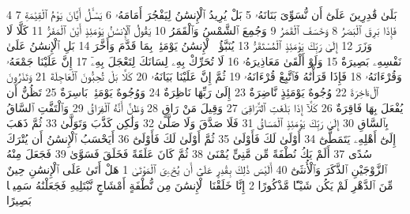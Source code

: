 {\tiny\colorbox{cl_aya}{4}} بَلَىٰ قَٰدِرِينَ عَلَىٰٓ أَن نُّسَوِّىَ بَنَانَهُۥ
{\tiny\colorbox{cl_aya}{5}} بَلْ يُرِيدُ ٱلْإِنسَٰنُ لِيَفْجُرَ أَمَامَهُۥ
{\tiny\colorbox{cl_aya}{6}} يَسْـَٔلُ أَيَّانَ يَوْمُ ٱلْقِيَٰمَةِ
{\tiny\colorbox{cl_aya}{7}} فَإِذَا بَرِقَ ٱلْبَصَرُ
{\tiny\colorbox{cl_aya}{8}} وَخَسَفَ ٱلْقَمَرُ
{\tiny\colorbox{cl_aya}{9}} وَجُمِعَ ٱلشَّمْسُ وَٱلْقَمَرُ
{\tiny\colorbox{cl_aya}{10}} يَقُولُ ٱلْإِنسَٰنُ يَوْمَئِذٍ أَيْنَ ٱلْمَفَرُّ
{\tiny\colorbox{cl_aya}{11}} كَلَّا لَا وَزَرَ
{\tiny\colorbox{cl_aya}{12}} إِلَىٰ رَبِّكَ يَوْمَئِذٍ ٱلْمُسْتَقَرُّ
{\tiny\colorbox{cl_aya}{13}} يُنَبَّؤُا۟ ٱلْإِنسَٰنُ يَوْمَئِذٍۭ بِمَا قَدَّمَ وَأَخَّرَ
{\tiny\colorbox{cl_aya}{14}} بَلِ ٱلْإِنسَٰنُ عَلَىٰ نَفْسِهِۦ بَصِيرَةٌ
{\tiny\colorbox{cl_aya}{15}} وَلَوْ أَلْقَىٰ مَعَاذِيرَهُۥ
{\tiny\colorbox{cl_aya}{16}} لَا تُحَرِّكْ بِهِۦ لِسَانَكَ لِتَعْجَلَ بِهِۦٓ
{\tiny\colorbox{cl_aya}{17}} إِنَّ عَلَيْنَا جَمْعَهُۥ وَقُرْءَانَهُۥ
{\tiny\colorbox{cl_aya}{18}} فَإِذَا قَرَأْنَٰهُ فَٱتَّبِعْ قُرْءَانَهُۥ
{\tiny\colorbox{cl_aya}{19}} ثُمَّ إِنَّ عَلَيْنَا بَيَانَهُۥ
{\tiny\colorbox{cl_aya}{20}} كَلَّا بَلْ تُحِبُّونَ ٱلْعَاجِلَةَ
{\tiny\colorbox{cl_aya}{21}} وَتَذَرُونَ ٱلْءَاخِرَةَ
{\tiny\colorbox{cl_aya}{22}} وُجُوهٌ يَوْمَئِذٍ نَّاضِرَةٌ
{\tiny\colorbox{cl_aya}{23}} إِلَىٰ رَبِّهَا نَاظِرَةٌ
{\tiny\colorbox{cl_aya}{24}} وَوُجُوهٌ يَوْمَئِذٍۭ بَاسِرَةٌ
{\tiny\colorbox{cl_aya}{25}} تَظُنُّ أَن يُفْعَلَ بِهَا فَاقِرَةٌ
{\tiny\colorbox{cl_aya}{26}} كَلَّآ إِذَا بَلَغَتِ ٱلتَّرَاقِىَ
{\tiny\colorbox{cl_aya}{27}} وَقِيلَ مَنْ رَاقٍ
{\tiny\colorbox{cl_aya}{28}} وَظَنَّ أَنَّهُ ٱلْفِرَاقُ
{\tiny\colorbox{cl_aya}{29}} وَٱلْتَفَّتِ ٱلسَّاقُ بِٱلسَّاقِ
{\tiny\colorbox{cl_aya}{30}} إِلَىٰ رَبِّكَ يَوْمَئِذٍ ٱلْمَسَاقُ
{\tiny\colorbox{cl_aya}{31}} فَلَا صَدَّقَ وَلَا صَلَّىٰ
{\tiny\colorbox{cl_aya}{32}} وَلَٰكِن كَذَّبَ وَتَوَلَّىٰ
{\tiny\colorbox{cl_aya}{33}} ثُمَّ ذَهَبَ إِلَىٰٓ أَهْلِهِۦ يَتَمَطَّىٰٓ
{\tiny\colorbox{cl_aya}{34}} أَوْلَىٰ لَكَ فَأَوْلَىٰ
{\tiny\colorbox{cl_aya}{35}} ثُمَّ أَوْلَىٰ لَكَ فَأَوْلَىٰٓ
{\tiny\colorbox{cl_aya}{36}} أَيَحْسَبُ ٱلْإِنسَٰنُ أَن يُتْرَكَ سُدًى
{\tiny\colorbox{cl_aya}{37}} أَلَمْ يَكُ نُطْفَةً مِّن مَّنِىٍّ يُمْنَىٰ
{\tiny\colorbox{cl_aya}{38}} ثُمَّ كَانَ عَلَقَةً فَخَلَقَ فَسَوَّىٰ
{\tiny\colorbox{cl_aya}{39}} فَجَعَلَ مِنْهُ ٱلزَّوْجَيْنِ ٱلذَّكَرَ وَٱلْأُنثَىٰٓ
{\tiny\colorbox{cl_aya}{40}} أَلَيْسَ ذَٰلِكَ بِقَٰدِرٍ عَلَىٰٓ أَن يُحْۦِىَ ٱلْمَوْتَىٰ
{\tiny\colorbox{cl_aya}{1}} هَلْ أَتَىٰ عَلَى ٱلْإِنسَٰنِ حِينٌ مِّنَ ٱلدَّهْرِ لَمْ يَكُن شَيْـًٔا مَّذْكُورًا
{\tiny\colorbox{cl_aya}{2}} إِنَّا خَلَقْنَا ٱلْإِنسَٰنَ مِن نُّطْفَةٍ أَمْشَاجٍ نَّبْتَلِيهِ فَجَعَلْنَٰهُ سَمِيعًۢا بَصِيرًا
